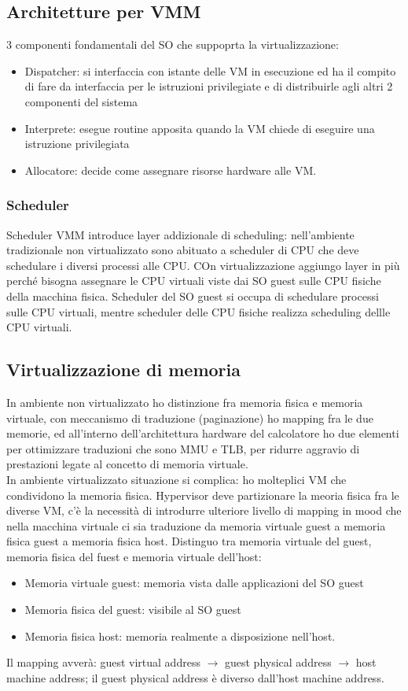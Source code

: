 \documentclass[16px]{article}
\begin{document}
\subsection{Architetture per VMM}
3 componenti fondamentali del SO che suppoprta la virtualizzazione:
\begin{itemize}
\item Dispatcher: si interfaccia con istante delle VM in esecuzione ed ha il compito di fare da interfaccia per le istruzioni privilegiate e di distribuirle agli altri 2 componenti del sistema
\item Interprete: esegue routine apposita quando la VM chiede di eseguire una istruzione privilegiata
\item Allocatore: decide come assegnare risorse hardware alle VM.
\end{itemize}
\subsubsection{Scheduler}
Scheduler VMM introduce layer addizionale di scheduling: nell'ambiente tradizionale non virtualizzato sono abituato a scheduler di CPU che deve schedulare i diversi processi alle CPU. COn virtualizzazione aggiungo layer in più perché bisogna assegnare le CPU virtuali viste dai SO guest sulle CPU fisiche della macchina fisica. Scheduler del SO guest si occupa di schedulare processi sulle 	CPU virtuali, mentre scheduler delle CPU fisiche realizza scheduling dellle CPU virtuali.
\subsection{Virtualizzazione di memoria}
In ambiente non virtualizzato ho distinzione fra memoria fisica e memoria virtuale, con meccanismo di traduzione (paginazione) ho mapping fra le due memorie, ed all'interno dell'architettura hardware del calcolatore ho due elementi per ottimizzare traduzioni che sono MMU e TLB, per ridurre aggravio di prestazioni legate al concetto di memoria virtuale.\\ In ambiente virtualizzato situazione si complica: ho molteplici VM che condividono la memoria fisica. Hypervisor deve partizionare la meoria fisica fra le diverse VM, c'è la necessità di introdurre ulteriore livello di mapping in mood che nella macchina virtuale ci sia traduzione da memoria virtuale guest a memoria fisica guest a memoria fisica host. Distinguo tra memoria virtuale del guest, memoria fisica del fuest e memoria virtuale dell'host:
\begin{itemize}
\item Memoria virtuale guest: memoria vista dalle applicazioni del SO guest
\item Memoria fisica del guest: visibile al SO guest
\item Memoria fisica host: memoria realmente a disposizione nell'host.
\end{itemize}
Il mapping avverà: guest virtual address $\rightarrow$ guest physical address $\rightarrow$ host machine address; il guest physical address è diverso dall'host machine address.
\end{document}
